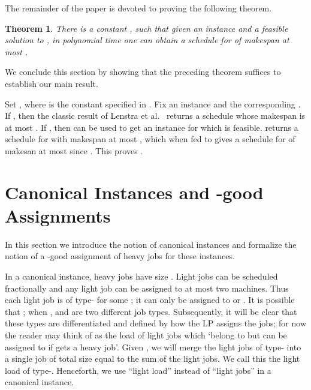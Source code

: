 \documentclass[11pt]{article}
\newenvironment{proofof}[1]{\rm \trivlist \item[\hskip \labelsep{\it #1.\/}]}{\outerparskip 0pt\endtrivlist}
\newtheorem{theorem}{Theorem} \newtheorem{lemma}{Lemma}[section]
\newenvironment{proofof}[1]{\begin{proof}[#1]}{\end{proof}}
\begin{document}
The remainder of the paper is devoted to proving the following theorem.

\begin{theorem} 
\label{thm:main-2}
There is a constant , such that given an instance  and a feasible solution to , in polynomial time one can obtain a schedule for  of makespan at most .
\end{theorem}

We conclude this section by showing that the preceding theorem suffices to establish our main result.

\begin{proofof}{\bf Proof of Theorem \ref{thm:main}}
Set , where  is the constant specified in .
Fix an instance  and the corresponding .
If , then the classic result of Lenstra et al.~\cite{LST90} returns a schedule whose makespan is at most .
If , then  can be used to get an instance  for which  is feasible.
 returns a schedule for  with makespan at most , which when fed to  gives
a schedule for  of makesan at most  since .
This proves .
\end{proofof}

\section{Canonical Instances and \texorpdfstring{}{delta}-good Assignments}
\label{sec:canonical_definition}

In this section we introduce the notion of canonical instances and formalize the notion of a -good assignment of heavy jobs for these instances.  



In a canonical instance, heavy jobs have size . Light jobs can be scheduled fractionally and any light job can be assigned to at most two machines. Thus each light job is of type- for some ; it can only be assigned to  or . It is possible that ; when ,  and  are two different job types. Subsequently, it will be clear that these types are differentiated and defined by how the LP assigns the jobs; for now the reader may think of  as the load of light jobs which `belong to  but can be assigned to  if  gets a heavy job'.
  Given , we will merge the light jobs of type- into a single job of total size equal to the sum of the light jobs. We call this the light load of type-.
Henceforth, we use ``light load'' instead of ``light jobs'' in a canonical instance. 
\end{document}
